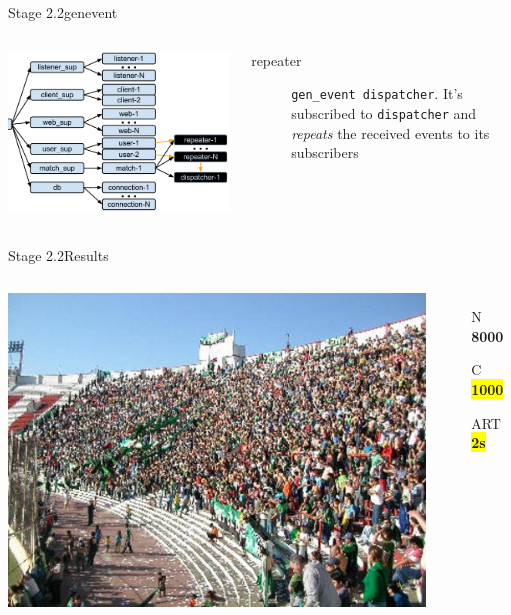 \documentclass[utf8]{beamer}
\begin{document}
\begin{frame}{Stage 2.2}{gen\textunderscore event}
	\begin{columns}
			\begin{center}
				\includegraphics[height=.75\textheight]{img/architecture-3-2.png}
			\end{center}
			\begin{description}
				\item[repeater]
					\texttt{gen\_event dispatcher}. It's subscribed to \texttt{dispatcher} and \emph{repeats} the received events to its subscribers
			\end{description}
	\end{columns}
\end{frame}
\begin{frame}{Stage 2.2}{Results}
	\begin{columns}
		\column{.66\textwidth}
			\includegraphics[top=-1,width=\textwidth]{img/results-3-2.jpg}
		\column{.33\textwidth}
			\begin{itemize}
				\item[N] \textbf{\Large 8000}
				\item[C] \textbf{\colorbox{yellow}{\Large 1000}}
				\item[ART] \textbf{\colorbox{yellow}{\Large 2s}}
			\end{itemize}
	\end{columns}
\end{frame}
\end{document}
